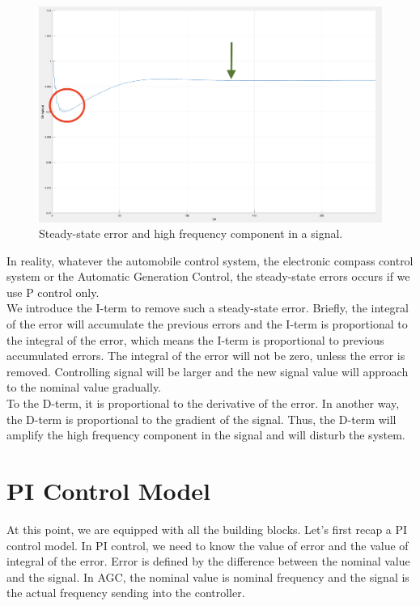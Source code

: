 \documentclass{report}
\begin{document}
\begin{figure}[htbp]
\centering
\includegraphics[width = .891\textwidth]{figure/3_2_steady.png}
\caption{Steady-state error and high frequency component in a signal.}
\label{3_2_steady}
\end{figure}

In reality, whatever the automobile control system, the electronic compass control system or the Automatic Generation Control, the steady-state errors occurs if we use P control only.\\

We introduce the I-term to remove such a steady-state error. Briefly, the integral of the error will accumulate the previous errors and the I-term is proportional to the integral of the error, which means the I-term is proportional to previous accumulated errors. The integral of the error will not be zero, unless the error is removed. Controlling signal will be larger and the new signal value will approach to the nominal value gradually.\\

To the D-term, it is proportional to the derivative of the error. In another way, the D-term is proportional to the gradient of the signal. Thus, the D-term will amplify the high frequency component in the signal and will disturb the system.\\


\section{PI Control Model} %
At this point, we are equipped with all the building blocks. Let’s first recap a PI control model. In PI control, we need to know the value of error and the value of integral of the error. Error is defined by the difference between the nominal value and the signal. In AGC, the nominal value is nominal frequency and the signal is the actual frequency sending into the controller.\\
\end{document}
